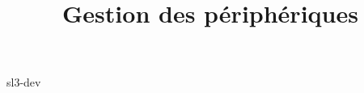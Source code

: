 \documentclass {beamer}
\title {Gestion des périphériques}
\begin{document}
 {sl3-dev}
\end{document}
